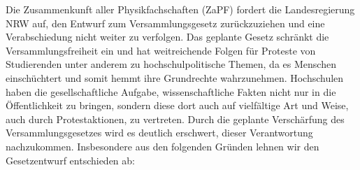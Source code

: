 \documentclass[DIV=calc]{scrartcl}
\begin{document}
Die Zusammenkunft aller Physikfachschaften (ZaPF) fordert die Landesregierung NRW auf, den Entwurf zum Versammlungsgesetz zurückzuziehen und eine Verabschiedung nicht weiter zu verfolgen. Das geplante Gesetz schränkt die Versammlungsfreiheit ein und hat weitreichende Folgen für Proteste von Studierenden unter anderem zu hochschulpolitische Themen, da es Menschen einschüchtert und somit hemmt ihre Grundrechte wahrzunehmen. Hochschulen haben die gesellschaftliche Aufgabe, wissenschaftliche Fakten nicht nur in die Öffentlichkeit zu bringen, sondern diese dort auch auf vielfältige Art und Weise, auch durch Protestaktionen, zu vertreten. Durch die geplante Verschärfung des Versammlungsgesetzes wird es deutlich erschwert, dieser Verantwortung nachzukommen. Insbesondere aus den folgenden Gründen lehnen wir den Gesetzentwurf entschieden ab:\\
\end{document}
